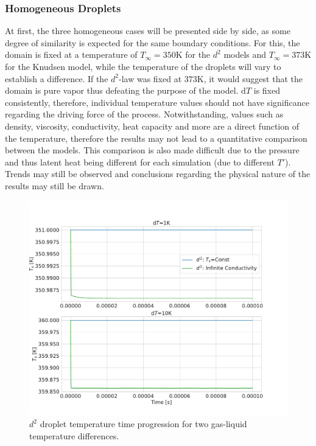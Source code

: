 \documentclass[12pt]{article}
\numberwithin{equation}{section}
\begin{document}
\subsubsection{Homogeneous Droplets}\label{sss:Results-homogeneous-droplets}
At first, the three homogeneous cases will be presented side by side, as some degree of similarity is expected for the same boundary conditions. For this, the domain is fixed at a temperature of $T_{\infty}=350 \mathrm{K}$ for the $d^{2}$ models and $T_{\infty}=373 \mathrm{K}$ for the Knudsen model, while the temperature of the droplets will vary to establish a difference. If the $d^{2}$-law was fixed at $373\mathrm{K}$, it would suggest that the domain is pure vapor thus defeating the purpose of the model. $\mathrm{d}T$ is fixed consistently, therefore, individual temperature values should not have significance regarding the driving force of the process. Notwithstanding, values such as density, viscosity, conductivity, heat capacity and more are a direct function of the temperature, therefore the results may not lead to a quantitative comparison between the models. This comparison is also made difficult due to the pressure and thus latent heat being different for each simulation (due to different $T'$). Trends may still be observed and conclusions regarding the physical nature of the results may still be drawn.  
\begin{figure}[H]
    \centering
    \includegraphics[trim={0 30 0 30},clip,width=1.0\textwidth]{Figures/D2_dT.pdf}
    \caption{$d^{2}$ droplet temperature time progression for two gas-liquid temperature differences.}
    \label{f:dT_hom_vs_D2}
\end{figure}
\end{document}
